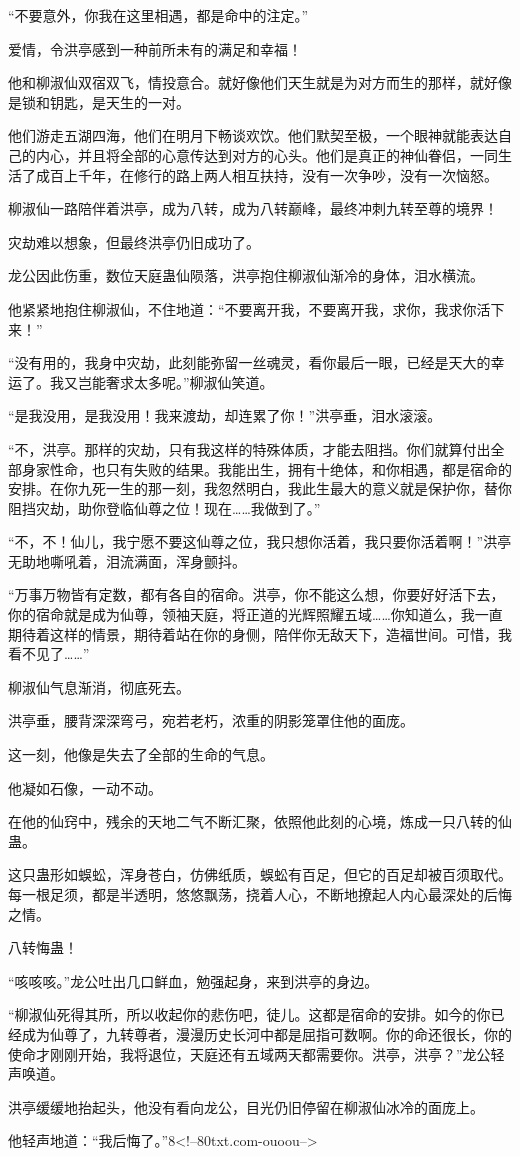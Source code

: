 \begin{this_body}
“不要意外，你我在这里相遇，都是命中的注定。”

爱情，令洪亭感到一种前所未有的满足和幸福！

他和柳淑仙双宿双飞，情投意合。就好像他们天生就是为对方而生的那样，就好像是锁和钥匙，是天生的一对。

他们游走五湖四海，他们在明月下畅谈欢饮。他们默契至极，一个眼神就能表达自己的内心，并且将全部的心意传达到对方的心头。他们是真正的神仙眷侣，一同生活了成百上千年，在修行的路上两人相互扶持，没有一次争吵，没有一次恼怒。

柳淑仙一路陪伴着洪亭，成为八转，成为八转巅峰，最终冲刺九转至尊的境界！

灾劫难以想象，但最终洪亭仍旧成功了。

龙公因此伤重，数位天庭蛊仙陨落，洪亭抱住柳淑仙渐冷的身体，泪水横流。

他紧紧地抱住柳淑仙，不住地道：“不要离开我，不要离开我，求你，我求你活下来！”

“没有用的，我身中灾劫，此刻能弥留一丝魂灵，看你最后一眼，已经是天大的幸运了。我又岂能奢求太多呢。”柳淑仙笑道。

“是我没用，是我没用！我来渡劫，却连累了你！”洪亭垂，泪水滚滚。

“不，洪亭。那样的灾劫，只有我这样的特殊体质，才能去阻挡。你们就算付出全部身家性命，也只有失败的结果。我能出生，拥有十绝体，和你相遇，都是宿命的安排。在你九死一生的那一刻，我忽然明白，我此生最大的意义就是保护你，替你阻挡灾劫，助你登临仙尊之位！现在……我做到了。”

“不，不！仙儿，我宁愿不要这仙尊之位，我只想你活着，我只要你活着啊！”洪亭无助地嘶吼着，泪流满面，浑身颤抖。

“万事万物皆有定数，都有各自的宿命。洪亭，你不能这么想，你要好好活下去，你的宿命就是成为仙尊，领袖天庭，将正道的光辉照耀五域……你知道么，我一直期待着这样的情景，期待着站在你的身侧，陪伴你无敌天下，造福世间。可惜，我看不见了……”

柳淑仙气息渐消，彻底死去。

洪亭垂，腰背深深弯弓，宛若老朽，浓重的阴影笼罩住他的面庞。

这一刻，他像是失去了全部的生命的气息。

他凝如石像，一动不动。

在他的仙窍中，残余的天地二气不断汇聚，依照他此刻的心境，炼成一只八转的仙蛊。

这只蛊形如蜈蚣，浑身苍白，仿佛纸质，蜈蚣有百足，但它的百足却被百须取代。每一根足须，都是半透明，悠悠飘荡，挠着人心，不断地撩起人内心最深处的后悔之情。

八转悔蛊！

“咳咳咳。”龙公吐出几口鲜血，勉强起身，来到洪亭的身边。

“柳淑仙死得其所，所以收起你的悲伤吧，徒儿。这都是宿命的安排。如今的你已经成为仙尊了，九转尊者，漫漫历史长河中都是屈指可数啊。你的命还很长，你的使命才刚刚开始，我将退位，天庭还有五域两天都需要你。洪亭，洪亭？”龙公轻声唤道。

洪亭缓缓地抬起头，他没有看向龙公，目光仍旧停留在柳淑仙冰冷的面庞上。

他轻声地道：“我后悔了。”8<!--80txt.com-ouoou-->

\end{this_body}


